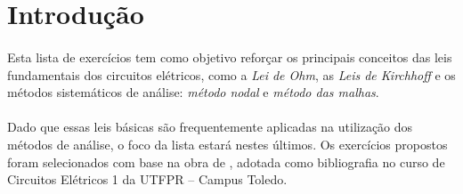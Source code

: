 \section{Introdução}

\paragraph{}
Esta lista de exercícios tem como objetivo reforçar os principais conceitos das
leis fundamentais dos circuitos elétricos, como a \textit{Lei de Ohm}, as
\textit{Leis de Kirchhoff} e os métodos sistemáticos de análise: \textit{método
nodal} e \textit{método das malhas}. 

\paragraph{}
Dado que essas leis básicas são frequentemente aplicadas na utilização dos
métodos de análise, o foco da lista estará nestes últimos. Os exercícios
propostos foram selecionados com base na obra de 
\cite{alexander2008}, adotada como bibliografia no curso de Circuitos Elétricos
1 da UTFPR – Campus Toledo.
